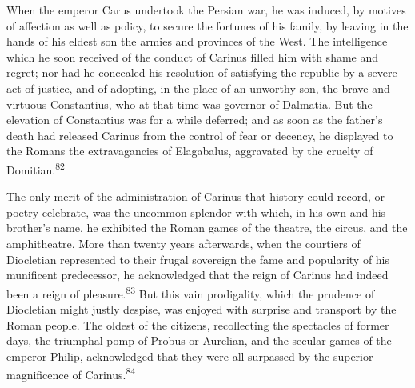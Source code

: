 

When the emperor Carus undertook the Persian war, he was induced,
by motives of affection as well as policy, to secure the fortunes
of his family, by leaving in the hands of his eldest son the
armies and provinces of the West. The intelligence which he soon
received of the conduct of Carinus filled him with shame and
regret; nor had he concealed his resolution of satisfying the
republic by a severe act of justice, and of adopting, in the
place of an unworthy son, the brave and virtuous Constantius, who
at that time was governor of Dalmatia. But the elevation of
Constantius was for a while deferred; and as soon as the father’s
death had released Carinus from the control of fear or decency,
he displayed to the Romans the extravagancies of Elagabalus,
aggravated by the cruelty of Domitian.\textsuperscript{82}


The only merit of the administration of Carinus that history
could record, or poetry celebrate, was the uncommon splendor with
which, in his own and his brother’s name, he exhibited the Roman
games of the theatre, the circus, and the amphitheatre. More than
twenty years afterwards, when the courtiers of Diocletian
represented to their frugal sovereign the fame and popularity of
his munificent predecessor, he acknowledged that the reign of
Carinus had indeed been a reign of pleasure.\textsuperscript{83} But this vain
prodigality, which the prudence of Diocletian might justly
despise, was enjoyed with surprise and transport by the Roman
people. The oldest of the citizens, recollecting the spectacles
of former days, the triumphal pomp of Probus or Aurelian, and the
secular games of the emperor Philip, acknowledged that they were
all surpassed by the superior magnificence of Carinus.\textsuperscript{84}


